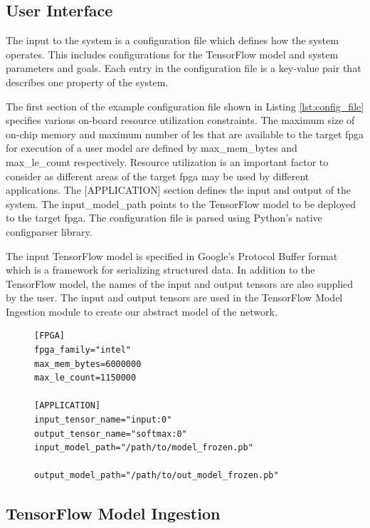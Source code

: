 \documentclass{uw-ece-wkrpt}
\begin{document}
\subsection{User Interface}

The input to the system is a configuration file which defines how the system operates. This includes configurations for the TensorFlow model and system parameters and goals. Each entry in the configuration file is a key-value pair that describes one property of the system.

The first section of the example configuration file shown in Listing \ref{lst:config_file} specifies various on-board resource utilization constraints. The maximum size of on-chip memory and maximum number of \glspl{le} that are available to the target \gls{fpga} for execution of a user model are defined by max\_mem\_bytes and max\_le\_count respectively. Resource utilization is an important factor to consider as different areas of the target \gls{fpga} may be used by different applications. The [APPLICATION] section defines the input and output of the system. The input\_model\_path points to the TensorFlow model to be deployed to the target \gls{fpga}. The configuration file is parsed using Python's native configparser library.

The input TensorFlow model is specified in Google's Protocol Buffer format which is a framework for serializing structured data. In addition to the TensorFlow model, the names of the input and output \glspl{tensor} are also supplied by the user. The input and output \glspl{tensor} are used in the TensorFlow Model Ingestion module to create our abstract model of the network.

\begin{figure}
\centering
\begin{lstlisting}[caption={Sample configuration file}, label=lst:config_file]
[FPGA]
fpga_family="intel"
max_mem_bytes=6000000
max_le_count=1150000

[APPLICATION]
input_tensor_name="input:0"
output_tensor_name="softmax:0"
input_model_path="/path/to/model_frozen.pb"

output_model_path="/path/to/out_model_frozen.pb"
\end{lstlisting}
\end{figure}

\subsection{TensorFlow Model Ingestion}
\end{document}

